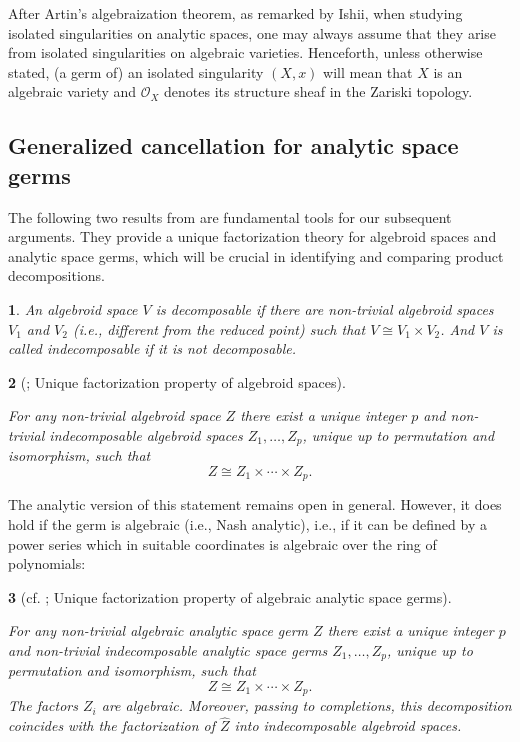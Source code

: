 \documentclass[10pt,a4paper]{amsart}
\numberwithin{equation}{section}
\numberwithin{figure}{section}
\newtheorem{thm}{\protect\theoremname}
\newtheorem{defn}[thm]{\protect\defnname}
\providecommand{\theoremname}{Theorem}
\providecommand{\defnname}{Definition}
\numberwithin{equation}{section}
\begin{document}
After Artin's algebraization theorem, as remarked by Ishii, when studying isolated singularities on analytic spaces, one may always assume that they arise from isolated singularities on algebraic varieties. Henceforth, unless otherwise stated, (a germ of) an isolated singularity $(X,x)$ will mean that $X$ is an algebraic variety and $\mathcal{O}_X$ denotes its structure sheaf in the Zariski topology.


\subsection{Generalized cancellation for analytic space germs}\label{subse2.3}
The following two results from \cite{HM1990} are fundamental tools for our subsequent arguments. They provide a unique factorization theory for algebroid spaces and analytic space germs, which will be crucial in identifying and comparing product decompositions.

\begin{defn}
    An algebroid space $V$ is \emph{decomposable} if there are non-trivial algebroid spaces $V_1$ and $V_2$ (i.e., different from the reduced point) such that $V\cong V_1 \times V_2$. And $V$ is called \emph{indecomposable} if it is not decomposable.
\end{defn}

\begin{thm}[{\cite[Theorem 2]{HM1990}}; Unique factorization property of algebroid spaces]\label{Thm: H-M_Unique factorization for algebroid spaces}\mbox{}

For any non-trivial algebroid space $Z$ there exist a unique integer $p$ and non-trivial indecomposable algebroid spaces $Z_1,\ldots,Z_p$, unique up to permutation and isomorphism, such that
\[
Z \cong Z_1 \times \cdots \times Z_p.
\]
\end{thm}

\medskip

The analytic version of this statement remains open in general. However, it does hold if the germ is algebraic (i.e., Nash analytic), i.e., if it can be defined by a power series which in suitable coordinates is algebraic over the ring of polynomials:

\begin{thm}[{cf. \cite[Theorem 3]{HM1990}}; Unique factorization property of algebraic analytic space germs]\label{Thm: H-M_Unique factorization for analytic space germs}\mbox{}

For any non-trivial algebraic analytic space germ $Z$ there exist a unique integer $p$ and non-trivial indecomposable analytic space germs $Z_1,\dots,Z_p$, unique up to permutation and isomorphism, such that
\[
Z \cong Z_1 \times \cdots \times Z_p.
\]
The factors $Z_i$ are algebraic. Moreover, passing to completions, this decomposition coincides with the factorization of $\widehat{Z}$ into indecomposable algebroid spaces.
\end{thm}
\end{document}
